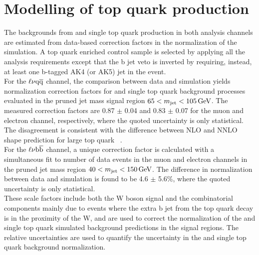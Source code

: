 \section{Modelling of top quark production}\label{sec:ttbar}

The backgrounds from \ttbar and single top quark production in both analysis channels are estimated from data-based correction factors in the normalization of the simulation.
A top quark enriched control sample is selected by applying all the analysis requirements except that the b jet veto is inverted by requiring, instead, at least one b-tagged AK4 (or AK5) jet in the event.\\

For the $\ell\nu\mathrm{q}\overline{\mathrm{q}}$ channel, the comparison between data and simulation yields normalization correction factors for \ttbar and single top quark background processes evaluated in the pruned jet mass signal region
$65 < m_{\text{jet}} < 105\,\text{Ge\hspace{-.08em}V}$. The measured correction factors are 0.87 $\pm$ 0.04 and 0.83 $\pm$ 0.07 for the muon and electron channel, respectively, where the quoted uncertainty is only statistical.
The disagreement is consistent with the difference between NLO and NNLO shape prediction for large top quark \pt~\cite{Czakon:2015owf}.\\

For the $\ell\nu{\mathrm{b}\overline{\mathrm{b}}}$ channel, a unique correction factor is calculated with a simultaneous fit to number of data events in the muon and electron channels in the pruned jet mass region $40 < m_{\text{jet}} < 150\,\text{Ge\hspace{-.08em}V}$.
The difference in normalization between data and simulation is found to be 4.6 $\pm$ 5.6\%, where the quoted uncertainty is only statistical. \\

These scale factors include both the W boson signal and the combinatorial components mainly due to events where the extra b jet from the top quark decay is in the proximity of the W, and are used to correct the normalization
of the \ttbar and single top quark simulated background predictions in the signal regions. The relative uncertainties are used to quantify the uncertainty in the \ttbar and single top quark background normalization.

